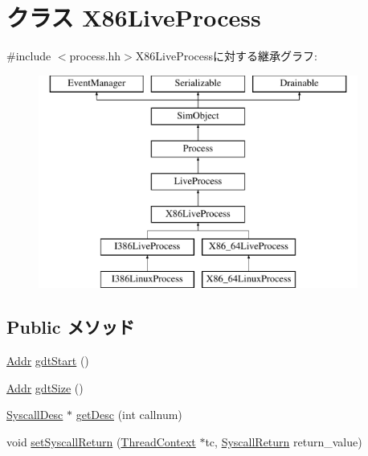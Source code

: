 \hypertarget{classX86ISA_1_1X86LiveProcess}{
\section{クラス X86LiveProcess}
\label{classX86ISA_1_1X86LiveProcess}
}


{\ttfamily \#include $<$process.hh$>$}X86LiveProcessに対する継承グラフ:\begin{figure}[H]
\begin{center}
\leavevmode
\includegraphics[height=7cm]{classX86ISA_1_1X86LiveProcess}
\end{center}
\end{figure}
\subsection*{Public メソッド}
\begin{DoxyCompactItemize}
\item 
\hyperlink{base_2types_8hh_af1bb03d6a4ee096394a6749f0a169232}{Addr} \hyperlink{classX86ISA_1_1X86LiveProcess_a3fa3a6673b5b14edb04c4b8dfdb46051}{gdtStart} ()
\item 
\hyperlink{base_2types_8hh_af1bb03d6a4ee096394a6749f0a169232}{Addr} \hyperlink{classX86ISA_1_1X86LiveProcess_abf5ae8f7b5ef9fdfd43c7b783fd540b1}{gdtSize} ()
\item 
\hyperlink{classSyscallDesc}{SyscallDesc} $\ast$ \hyperlink{classX86ISA_1_1X86LiveProcess_aebbff609a7235342925445690acf5ee8}{getDesc} (int callnum)
\item 
void \hyperlink{classX86ISA_1_1X86LiveProcess_aaefd02663c1eae206b851290d9276a5e}{setSyscallReturn} (\hyperlink{classThreadContext}{ThreadContext} $\ast$tc, \hyperlink{classSyscallReturn}{SyscallReturn} return\_\-value)
\end{DoxyCompactItemize}
